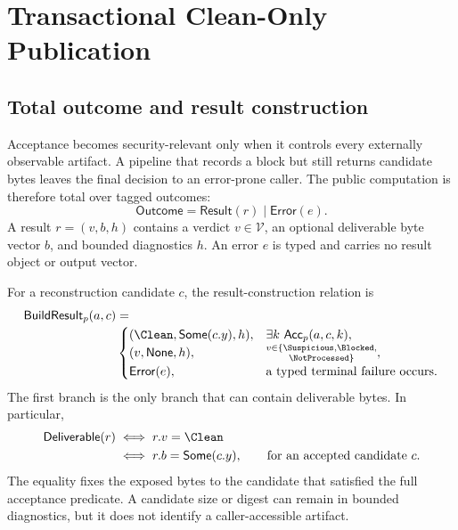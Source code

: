 \section{Transactional Clean-Only Publication}
\label{sec:publication-semantics}

\subsection{Total outcome and result construction}

Acceptance becomes security-relevant only when it controls every externally
observable artifact. A pipeline that records a block but still returns candidate
bytes leaves the final decision to an error-prone caller. The public computation
is therefore total over tagged outcomes:
\begin{equation}
  \mathsf{Outcome}=\mathsf{Result}(r)\mid\mathsf{Error}(e).
  \label{eq:outcome-sum}
\end{equation}
A result $r=(v,b,h)$ contains a verdict $v\in\mathcal{V}$, an optional
deliverable byte vector $b$, and bounded diagnostics $h$. An error $e$ is typed
and carries no result object or output vector.

For a reconstruction candidate $c$, the result-construction relation is
\begin{equation}
\begin{aligned}
\mathsf{BuildResult}_{p}(a,c)&={}\\[-0.5ex]
&\begin{cases}
 (\Clean,\mathsf{Some}(c.y),h),
   & \exists k\ \mathsf{Acc}_{p}(a,c,k),\\
 (v,\mathsf{None},h),
   & \substack{v\in\{\Suspicious,\Blocked,\\
      \NotProcessed\}},\\
 \mathsf{Error}(e),
   & \text{a typed terminal failure occurs}.
\end{cases}
\end{aligned}
\label{eq:build-result}
\end{equation}
The first branch is the only branch that can contain deliverable bytes. In
particular,
\begin{equation}
\begin{aligned}
  \mathsf{Deliverable}(r)
  &\iff r.v=\Clean\\
  &\iff r.b=\mathsf{Some}(c.y),
  \qquad \text{for an accepted candidate }c.
\end{aligned}
  \label{eq:clean-only-delivery}
\end{equation}
The equality fixes the exposed bytes to the candidate that satisfied the full
acceptance predicate. A candidate size or digest can remain in bounded
diagnostics, but it does not identify a caller-accessible artifact.


